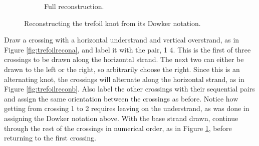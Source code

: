\documentclass[titlepage]{article}
\begin{document}
\begin{figure}[h!]
\begin{subfigure}[b]{0.3\linewidth}
        \vspace{-0.8em}
        \caption{Full reconstruction.}
        \label{fig:trefoilreconc}
    \end{subfigure}
    \caption{Reconstructing the trefoil knot from its Dowker notation.}
    \label{fig:trefoilrecon}
\end{figure}

Draw a crossing with a horizontal understrand and vertical overstrand, as in Figure \ref{fig:trefoilrecona}, and label it with the pair, 1 4. This is the first of three crossings to be drawn along the horizontal strand. The next two can either be drawn to the left or the right, so arbitrarily choose the right. Since this is an alternating knot, the crossings will alternate along the horizontal strand, as in Figure \ref{fig:trefoilreconb}. Also label the other crossings with their sequential pairs and assign the same orientation between the crossings as before. Notice how getting from crossing 1 to 2 requires leaving on the understrand, as was done in assigning the Dowker notation above. With the base strand drawn, continue through the rest of the crossings in numerical order, as in Figure \ref{fig:trefoilreconc}, before returning to the first crossing.\par
\end{document}
